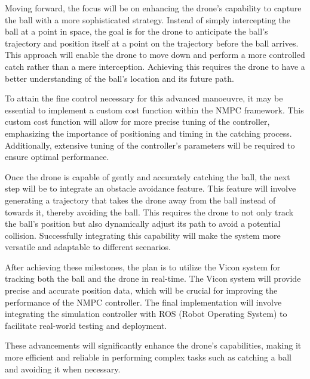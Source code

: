 \documentclass{UoNMCHA}
\numberwithin{equation}{section}
\begin{document}
Moving forward, the focus will be on enhancing the drone's capability to capture the ball with a more sophisticated strategy. Instead of simply intercepting the ball at a point in space, the goal is for the drone to anticipate the ball's trajectory and position itself at a point on the trajectory before the ball arrives. This approach will enable the drone to move down and perform a more controlled catch rather than a mere interception. Achieving this requires the drone to have a better understanding of the ball's location and its future path.

To attain the fine control necessary for this advanced manoeuvre, it may be essential to implement a custom cost function within the NMPC framework. This custom cost function will allow for more precise tuning of the controller, emphasizing the importance of positioning and timing in the catching process. Additionally, extensive tuning of the controller's parameters will be required to ensure optimal performance.

Once the drone is capable of gently and accurately catching the ball, the next step will be to integrate an obstacle avoidance feature. This feature will involve generating a trajectory that takes the drone away from the ball instead of towards it, thereby avoiding the ball. This requires the drone to not only track the ball's position but also dynamically adjust its path to avoid a potential collision. Successfully integrating this capability will make the system more versatile and adaptable to different scenarios.

After achieving these milestones, the plan is to utilize the Vicon system for tracking both the ball and the drone in real-time. The Vicon system will provide precise and accurate position data, which will be crucial for improving the performance of the NMPC controller. The final implementation will involve integrating the simulation controller with ROS (Robot Operating System) to facilitate real-world testing and deployment.

These advancements will significantly enhance the drone's capabilities, making it more efficient and reliable in performing complex tasks such as catching a ball and avoiding it when necessary.

\newpage

\appendix
\newpage
\end{document}
